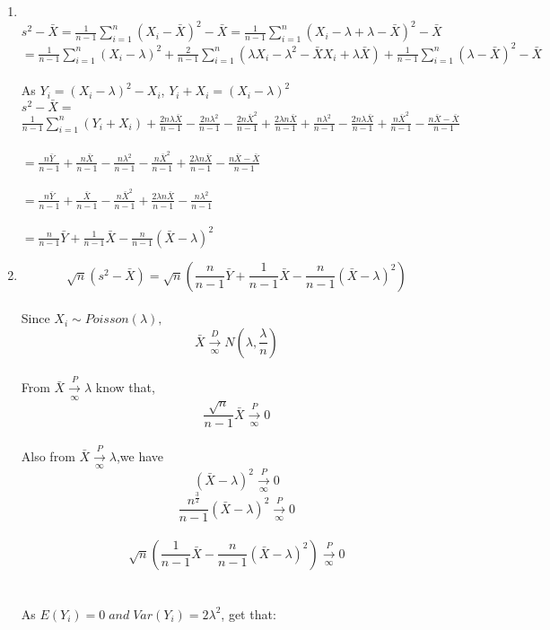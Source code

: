 \documentclass[11pt]{article}
\begin{document}
\begin{enumerate}
\item
\\
$s^2 - \bar{X} = \frac{1}{n-1} \sum \limits_{i=1}^{n} (X_i - \bar{X})^2  - \bar{X}= \frac{1}{n-1}\sum \limits_{i=1}^{n} (X_i - \lambda + \lambda - \bar{X})^2  - \bar{X}$\\
$= \frac{1}{n-1} \sum \limits_{i=1}^{n} (X_i - \lambda)^2 + \frac{2}{n-1} \sum \limits_{i=1}^{n} (\lambda X_i - \lambda^2 - \bar{X}X_i + \lambda \bar{X}) + \frac{1}{n-1}\sum \limits_{i=1}^{n}(\lambda - \bar{X})^2  - \bar{X}$\\\\
As $Y_i = (X_i - \lambda)^2 - X_i$, $Y_i+X_i = (X_i - \lambda)^2$\\
$s^2 - \bar{X} = $
$\frac{1}{n-1} \sum \limits_{i=1}^{n}(Y_i+X_i)+\frac{2n\lambda\bar{X}}{n-1} - \frac{2n\lambda^2}{n-1} - \frac{2n\bar{X}^2}{n-1}+\frac{2\lambda n \bar{X}}{n-1} + \frac{n\lambda^2}{n-1} - \frac{2n\lambda\bar{X}}{n-1}+\frac{n\bar{X}^2}{n-1} - \frac{n\bar{X}-\bar{X}}{n-1}$\\\\
$= \frac{n\bar{Y}}{n-1} + \frac{n\bar{X}}{n-1} - \frac{n\lambda^2}{n-1} - \frac{n\bar{X}^2}{n-1}+\frac{2\lambda n \bar{X}}{n-1} - \frac{n\bar{X}-\bar{X}}{n-1}$\\\\
$= \frac{n\bar{Y}}{n-1}+\frac{\bar{X}}{n-1} - \frac{n\bar{X}^2}{n-1}+\frac{2\lambda n \bar{X}}{n-1} - \frac{n\lambda^2}{n-1}$\\\\
$= \frac{n}{n-1} \bar{Y} + \frac{1}{n-1} \bar{X} - \frac{n}{n-1} (\bar{X}-\lambda)^2$
\item
$$\sqrt{n}(s^2 - \bar{X}) = \sqrt{n}(\frac{n}{n-1} \bar{Y} + \frac{1}{n-1} \bar{X} - \frac{n}{n-1} (\bar{X}-\lambda)^2)$$\\
Since $X_i \sim Poisson(\lambda),$
$$\bar{X} \xrightarrow[\infty]{D} N(\lambda,\frac{\lambda}{n})$$\\
From $\bar{X} \xrightarrow[\infty]{P} \lambda$ know that,
$$\frac{\sqrt{n}}{n-1} \bar{X} \xrightarrow[\infty]{P} 0$$\\
Also from $\bar{X} \xrightarrow[\infty]{P} \lambda$,we have\\
$$(\bar{X}-\lambda)^2 \xrightarrow[\infty]{P} 0$$ $$\frac{n^{\frac{3}{2}}}{n-1} (\bar{X}-\lambda)^2 \xrightarrow[\infty]{P} 0$$\\
$$\sqrt{n}(\frac{1}{n-1} \bar{X} - \frac{n}{n-1} (\bar{X}-\lambda)^2)\xrightarrow[\infty]{P} 0$$\\
\\
As $E(Y_i) = 0 \; and\;Var(Y_i) = 2\lambda^2$, get that:\\

\end{enumerate}
\end{document}
